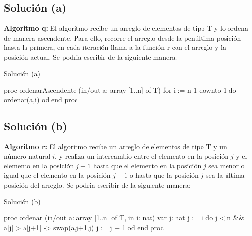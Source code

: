 \subsection{Solución (a)}
\textbf{Algoritmo q:} El algoritmo recibe un arreglo de elementos de tipo T y lo ordena de manera ascendente. Para ello, recorre el arreglo desde la penúltima posición hasta la primera, en cada iteración llama a la función r con el arreglo y la posición actual.
Se podria escribir de la siguiente manera:

\begin{codebox}{Solución (a)}
\begin{pascallike}
proc ordenarAscendente (in/out a: array [1..n] of T)
    for i := n-1 downto 1 do
    ordenar(a,i)
    od
end proc
\end{pascallike}
\end{codebox}

\subsection{Solución (b)}
\textbf{Algoritmo r:} El algoritmo recibe un arreglo de elementos de tipo T y un número natural $i$, y realiza un intercambio entre el elemento en la posición $j$ y el elemento en la posición $j+1$ hasta que el elemento en la posición $j$ sea menor o igual que el elemento en la posición $j+1$ o hasta que la posición $j$ sea la última posición del arreglo.
Se podria escribir de la siguiente manera:

\begin{codebox}{Solución (b)}
\begin{pascallike}
proc ordenar (in/out a: array [1..n] of T, in i: nat)
    var j: nat
    j := i
    do j < n && a[j] > a[j+1] ->
    swap(a,j+1,j)
    j := j + 1
    od
end proc
\end{pascallike}
\end{codebox}